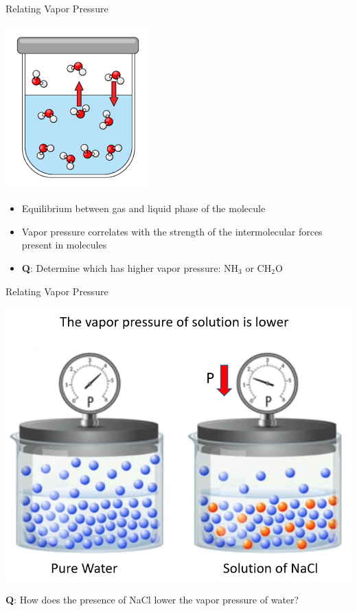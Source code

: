 \documentclass[11pt]{beamer}
\begin{document}
\begin{frame}{Relating Vapor Pressure}
  \begin{center}
    \includegraphics[width=0.3\linewidth]{vapor_pressure}
  \end{center}
  \begin{itemize}
  \item Equilibrium between gas and liquid phase of the molecule
  \item Vapor pressure correlates with the strength of the
    intermolecular forces present in molecules
  \item \textbf{Q}: Determine which has higher vapor pressure:
    NH$_3$ or CH$_2$O
  \end{itemize}
\end{frame}

\begin{frame}{Relating Vapor Pressure}
  \begin{center}
    \includegraphics[width=0.7\linewidth]{soln_vp}
  \end{center}
  \textbf{Q}: How does the presence of NaCl lower the vapor
  pressure of water?
\end{frame}
\end{document}
